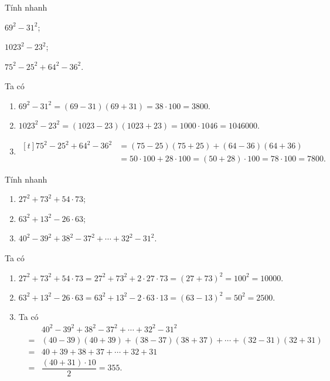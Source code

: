 \begin{vd}
	Tính nhanh
	\begin{listEX}[3]
		\item $69^2 - 31^2$;
		\item $1023^2 - 23^2$;
		\item $75^2 - 25^2 + 64^2 - 36^2$.
	\end{listEX}
	\loigiai 
	{
		Ta có
		\begin{enumerate}
			\item $69^2 - 31^2 = (69-31)(69+31) = 38 \cdot 100 = 3800.$
			\item $1023^2 - 23^2 = (1023 - 23)(1023 + 23) = 1000 \cdot 1046 = 1046000.$
			\item 
			{\allowdisplaybreaks
				$\begin{aligned}[t] 
					75^2 - 25^2 + 64^2 - 36^2 &= (75 - 25)(75+25) + (64-36)(64+36) \\ 
					&= 50 \cdot 100 + 28 \cdot 100 = (50+28) \cdot 100 = 78 \cdot 100 = 7800. 
				\end{aligned}$
			}
		\end{enumerate}
	}
\end{vd}

\begin{vd}
	Tính nhanh
	\begin{enumerate}
		\item $27^2 + 73^2 + 54 \cdot 73$;
		\item $63^2 + 13^2 - 26 \cdot 63$;
		\item $40^2 - 39^2 + 38^2 - 37^2 + \cdots + 32^2 - 31^2$.
	\end{enumerate}
	\loigiai 
	{
		Ta có
		\begin{enumerate}
			\item $27^2 + 73^2 + 54 \cdot 73 = 27^2 + 73^2 + 2 \cdot 27 \cdot 73 = (27+73)^2 = 100^2 = 10000.$
			\item $63^2 + 13^2 - 26 \cdot 63 = 63^2 + 13^2 - 2\cdot 63 \cdot 13 = (63 - 13)^2 = 50^2 = 2500.$
			\item Ta có
			{\allowdisplaybreaks
				\begin{eqnarray*} 
						&& 40^2 - 39^2 + 38^2 - 37^2 + \cdots + 32^2 - 31^2 \\
					&=& (40 - 39)(40+39) + (38 - 37)(38+37) + \cdots + (32-31)(32+31)\\
					&=& 40 + 39 + 38 + 37 + \cdots + 32 + 31\\
					&=& \dfrac{(40+31) \cdot 10}{2} = 355.
				\end{eqnarray*}
			}
		\end{enumerate}
	}
\end{vd}

